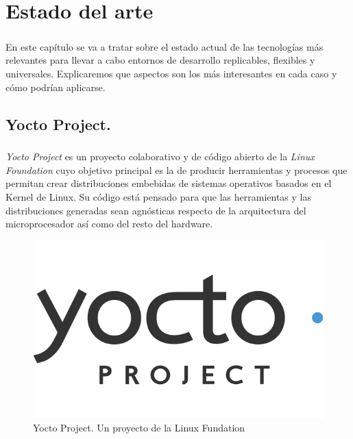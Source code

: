 \chapter{Estado del arte}\label{sec:estadodelarte}

\paragraph{}En este capítulo se va a tratar sobre el estado actual de las tecnologías
más relevantes para llevar a cabo entornos de desarrollo replicables, flexibles y universales.
Explicaremos que aspectos son los más interesantes en cada caso y cómo podrían aplicarse.

\section{Yocto Project.}\label{sec:yocto}

\paragraph{} \emph{Yocto Project} es un proyecto colaborativo y de código abierto
de la \emph{Linux Foundation} cuyo objetivo principal es la de producir herramientas y
procesos que permitan crear distribuciones embebidas de sistemas operativos basados
en el Kernel de Linux. Su código está pensado para que las herramientas y las distribuciones
generadas sean agnósticas respecto de la arquitectura del microprocesador así como del
resto del hardware.
\cite{yoctoprojectpage}

\begin{figure}[h]
	\centering
	\includegraphics[width=0.35\linewidth]{imgs/yocto-logo}
	\caption[Logo Yocto Project]{Yocto Project. Un proyecto de la Linux Fundation}
	\label{fig:yocto_logo}
\end{figure}

